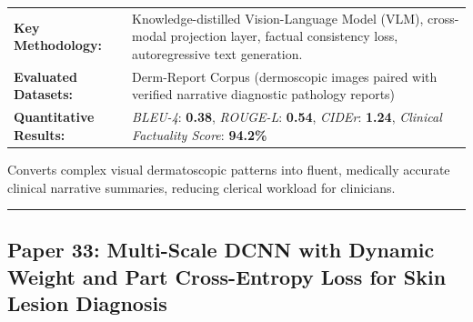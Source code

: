 \documentclass[10pt,a4paper]{article}
\begin{document}
\vspace{4pt}
\begin{tabularx}{\linewidth}{p{3.2cm}X}
\toprule
\textbf{Key Methodology:} & Knowledge-distilled Vision-Language Model (VLM), cross-modal projection layer, factual consistency loss, autoregressive text generation. \\
\textbf{Evaluated Datasets:} & Derm-Report Corpus (dermoscopic images paired with verified narrative diagnostic pathology reports) \\
\textbf{Quantitative Results:} & \textit{BLEU-4}: \textbf{0.38}, \textit{ROUGE-L}: \textbf{0.54}, \textit{CIDEr}: \textbf{1.24}, \textit{Clinical Factuality Score}: \textbf{94.2\%} \\
\bottomrule
\end{tabularx}
\vspace{4pt}
\begin{tcolorbox}[utilitybox,title=Clinical Utility and Real-World Impact]
Converts complex visual dermatoscopic patterns into fluent, medically accurate clinical narrative summaries, reducing clerical workload for clinicians.
\end{tcolorbox}
\vspace{12pt}
\hrule
\vspace{12pt}
\subsection*{Paper 33: Multi-Scale DCNN with Dynamic Weight and Part Cross-Entropy Loss for Skin Lesion Diagnosis}
\end{document}

